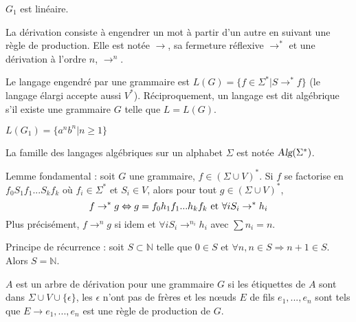 \documentclass[a4paper]{article}
\begin{document}
\begin{ex}$G_1$ est linéaire.\end{ex}

La dérivation consiste à engendrer un mot à partir d'un autre en suivant une règle de production. Elle est notée $\rightarrow$, sa fermeture réflexive $\rightarrow^*$ et une dérivation à l'ordre $n$, $\rightarrow^n$.

\begin{defi}
Le langage engendré par une grammaire est $L(G) = \{f\in\Sigma^* | S\rightarrow^*f\}$ (le langage élargi accepte aussi $V^*$). Réciproquement, un langage est dit algébrique s'il existe une grammaire $G$ telle que $L=L(G)$.
\end{defi}

\begin{ex}$L(G_1)=\{a^nb^n | n\geqslant1\}$\end{ex}

La famille des langages algébriques sur un alphabet $\Sigma$ est notée $\textsl{Alg}(\Sigma^*)$.

\begin{lem}
Lemme fondamental : soit $G$ une grammaire, $f\in(\Sigma\cup V)^*$. Si $f$ se factorise en $f_0S_1f_1...S_kf_k$ où $f_i\in\Sigma^*$ et $S_i\in V$, alors pour tout $g\in(\Sigma\cup V)^*$, $$f\rightarrow^*g \Leftrightarrow g=f_0h_1f_1...h_kf_k \textnormal{ et }\forall i S_i\rightarrow^*h_i$$
Plus précisément, $f\rightarrow^ng$ si idem et $\forall i S_i\rightarrow^{n_i}h_i$ avec $\sum n_i = n$.
\end{lem}

\begin{prop}
Principe de récurrence : soit $S\subset\mathbb{N}$ telle que $0\in S$ et $\forall n, n\in S \Rightarrow n+1\in S$. Alors $S=\mathbb{N}$.
\end{prop}

\begin{defi}
$A$ est un arbre de dérivation pour une grammaire $G$ si les étiquettes de $A$ sont dans $\Sigma\cup V\cup\{\epsilon\}$, les $\epsilon$ n'ont pas de frères et les n\oe uds $E$ de fils $e_1,...,e_n$ sont tels que $E\rightarrow e_1,...,e_n$ est une règle de production de $G$.
\end{defi}
\end{document}
